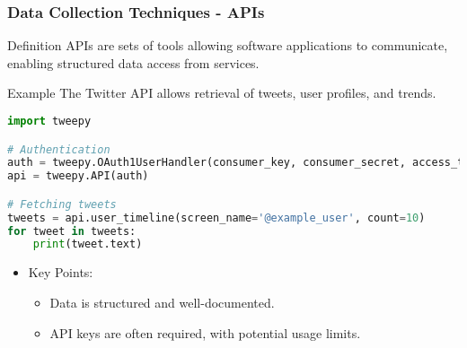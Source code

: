 \documentclass{beamer}
\begin{document}
\begin{frame}[fragile]
    \frametitle{Data Collection Techniques - APIs}
    \begin{block}{Definition}
        APIs are sets of tools allowing software applications to communicate, enabling structured data access from services.
    \end{block}

    \begin{block}{Example}
        The Twitter API allows retrieval of tweets, user profiles, and trends.
    \end{block}

    \begin{lstlisting}[language=Python]
import tweepy

# Authentication
auth = tweepy.OAuth1UserHandler(consumer_key, consumer_secret, access_token, access_token_secret)
api = tweepy.API(auth)

# Fetching tweets
tweets = api.user_timeline(screen_name='@example_user', count=10)
for tweet in tweets:
    print(tweet.text)
    \end{lstlisting}
    
    \begin{itemize}
        \item Key Points:
        \begin{itemize}
            \item Data is structured and well-documented.
            \item API keys are often required, with potential usage limits.
        \end{itemize}
    \end{itemize}
\end{frame}
\end{document}
